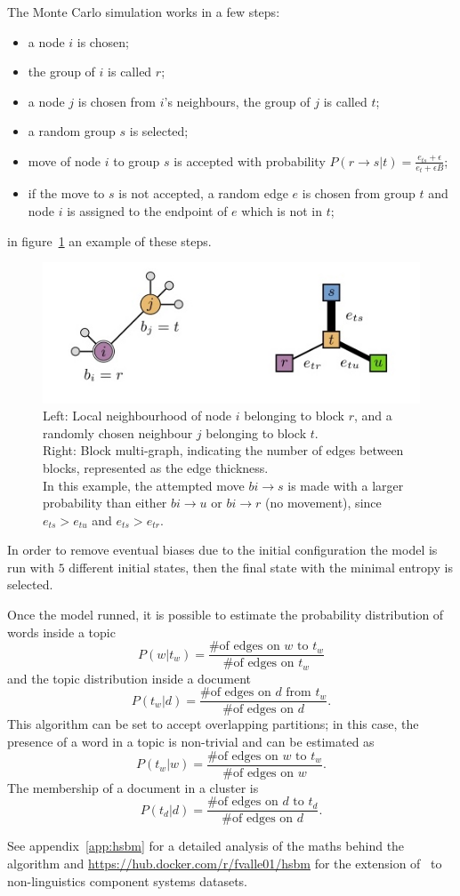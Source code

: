 The Monte Carlo simulation works in a few steps:
\begin{itemize}
 \item a node $i$ is chosen;
 \item the group of $i$ is called $r$;
  \item a node $j$ is chosen from $i$'s neighbours, the group of $j$ is called $t$;
  \item a random group $s$ is selected;
  \item move of node $i$ to group $s$ is accepted with probability $P(r\to s|t)=\frac{e_{ts}+\epsilon}{e_t+\epsilon B}$;
  \item if the move to $s$ is not accepted, a random edge $e$ is chosen from group $t$ and node $i$ is assigned to the endpoint of $e$ which is not in $t$;
\end{itemize}
in figure~\ref{fig:topic_peixioto_move} an example of these steps.
\begin{figure}[htb!]
  \centering
  \includegraphics[width=0.9\linewidth]{pictures/topic/peixioto_move.jpg}
  \caption{Left: Local neighbourhood of node $i$ belonging to block $r$, and a randomly chosen neighbour $j$ belonging to block $t$. \\
  Right: Block multi-graph, indicating the number of edges between blocks, represented as the edge thickness. \\
  In this example, the attempted move $bi \to s$ is made with a larger probability than either $bi \to u$ or $bi \to r$ (no movement), since $e_{ts}>e_{tu}$ and $e_{ts}>e_{tr}$.}
  \label{fig:topic_peixioto_move}
\end{figure}

In order to remove eventual biases due to the initial configuration the model is run with $5$ different initial states, then the final state with the minimal entropy is selected.

Once the model runned, it is possible to estimate the probability distribution of words inside a topic
\[P(w|t_w)=\frac{\text{\# of edges on $w$ to $t_w$}}{\text{\# of edges on $t_w$}}\]
and the topic distribution inside a document
\[P(t_w|d)=\frac{\text{\# of edges on $d$ from $t_w$}}{\text{\# of edges on $d$}}.\]
This algorithm can be set to accept overlapping partitions; in this case, the presence of a word in a topic is non-trivial and can be estimated as
\[P(t_w|w)=\frac{\text{\# of edges on $w$ to $t_w$}}{\text{\# of edges on $w$}}.\]
The membership of a document in a cluster is
\[P(t_d|d)=\frac{\text{\# of edges on $d$ to $t_d$}}{\text{\# of edges on $d$}}.\]

See appendix~\ref{app:hsbm} for a detailed analysis of the maths behind the algorithm and \url{https://hub.docker.com/r/fvalle01/hsbm} for the extension of~\cite{gerlach2018network} to non-linguistics component systems datasets.
